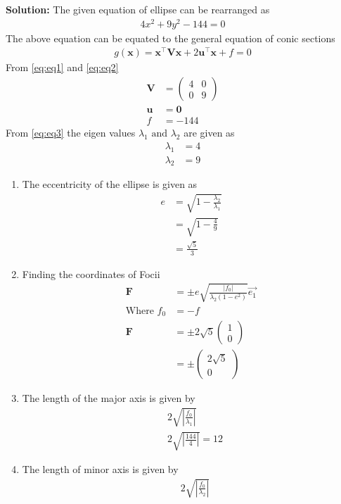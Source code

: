 \documentclass[12pt]{article}
\providecommand{\brak}[1]{\ensuremath{\left(#1\right)}}
\providecommand{\abs}[1]{\left\vert#1\right\vert}
\newcommand{\solution}{\noindent \textbf{Solution: }}
\newcommand{\myvec}[1]{\ensuremath{\begin{pmatrix}#1\end{pmatrix}}}
\let\vec\mathbf
\begin{document}
\begin{enumerate}
\solution
The given equation of ellipse can be rearranged as 
\begin{align}
 4x^2+9y^2-144=0\label{eq:eq1}
\end{align}
The above equation can be equated to the general equation of conic sections
\begin{align}
 g\brak{\vec{x}}=\vec{x}^\top \vec{V} \vec{x} + 2\vec{u}^\top \vec{x} + f = 0\label{eq:eq2}
\end{align}
From \eqref{eq:eq1} and \eqref{eq:eq2}
\begin{align}
 \vec{V} &= \myvec{4&0\\0&9}\label{eq:eq3}\\
 \vec{u} &= \vec{0}\\
 f &= -144
\end{align}
From \eqref{eq:eq3} the eigen values $\lambda_1 \text{ and } \lambda_2$ are given as
\begin{align}
 \lambda_1 &= 4\\
 \lambda_2 &= 9
\end{align}
\begin{enumerate}
\item The eccentricity of the ellipse is given as
\begin{align}
 e &= \sqrt{1 - \frac{\lambda_2}{\lambda_1}} \\
          &= \sqrt{1-\frac{4}{9}}\\
   &= \frac{\sqrt{5}}{3}
\end{align}
\item Finding the coordinates of Focii
\begin{align}
 \vec{F} &= \pm e\sqrt{\frac{\abs{f_0}}{\lambda_2\brak{1-e^2}}}\Vec{e_1}\\
\text{Where }f_0 &=-f\\
 \vec{F} &= \pm2\sqrt{5}\myvec{1\\0}\\
	&= \pm\myvec{2\sqrt{5}\\0}
\end{align}
\item The length of the major axis is given by
\begin{align}
 &2\sqrt{\abs{\frac{f_0}{\lambda_1}}}\\
        &2\sqrt{\abs{\frac{144}{4}}}= 12
\end{align}
\item The length of minor axis is given by
\begin{align}
 &2\sqrt{\abs{\frac{f_0}{\lambda_2}}}\\

\end{align}
\end{enumerate}
\end{enumerate}
\end{document}

